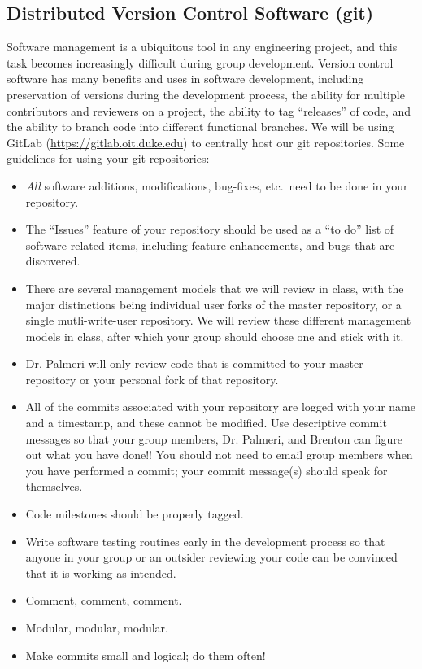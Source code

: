 \subsection*{Distributed Version Control Software (git)} 
Software management is a ubiquitous tool in any engineering
project, and this task becomes increasingly difficult during group development.
Version control software has many benefits and uses in software development,
including preservation of versions during the development process, the ability
for multiple contributors and reviewers on a project, the ability to tag
``releases'' of code, and the ability to branch code into different functional
branches.  We will be using GitLab (\url{https://gitlab.oit.duke.edu}) to
centrally host our git repositories. Some guidelines for using your git repositories:

\begin{itemize}
    \item \emph{All} software additions, modifications, bug-fixes, etc.\ need
        to be done in your repository.
    \item The ``Issues'' feature of your repository should be used as a ``to
        do'' list of software-related items, including feature enhancements,
        and bugs that are discovered.
    \item There are several management models that we will review in class,
        with the major distinctions being individual user forks of the master
        repository, or a single mutli-write-user repository.  We will review
        these different management models in class, after which your group
        should choose one and stick with it.
    \item Dr. Palmeri will only review code that is committed to your master
        repository or your personal fork of that repository.  
    \item All of the commits associated with your repository are logged with
        your name and a timestamp, and these cannot be modified.  Use
        descriptive commit messages so that your group members, Dr. Palmeri,
        and Brenton can figure out what you have done!!  You should not
        need to email group members when you have performed a commit; your
        commit message(s) should speak for themselves.
    \item Code milestones should be properly tagged.
    \item Write software testing routines early in the development process so
        that anyone in your group or an outsider reviewing your code can be
        convinced that it is working as intended.
    \item Comment, comment, comment.
    \item Modular, modular, modular.
    \item Make commits small and logical; do them often!
\end{itemize}


